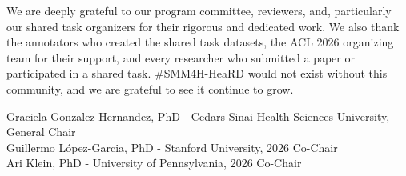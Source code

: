\documentclass[11pt,oneside]{book}
\begin{document}
\par\vspace{1em}
We are deeply grateful to our program committee, reviewers, and, particularly our shared task organizers for their rigorous and dedicated work. We also thank the annotators who created the shared task datasets, the ACL 2026 organizing team for their support, and every researcher who submitted a paper or participated in a shared task. \#SMM4H-HeaRD would not exist without this community, and we are grateful to see it continue to grow.

\par\vspace{2em}
\begin{flushleft}
Graciela Gonzalez Hernandez, PhD - Cedars-Sinai Health Sciences University, General Chair\\
Guillermo López-Garcia, PhD - Stanford University, 2026 Co-Chair\\
Ari Klein, PhD - University of Pennsylvania, 2026 Co-Chair
\end{flushleft}


  \newpage
\end{document}
